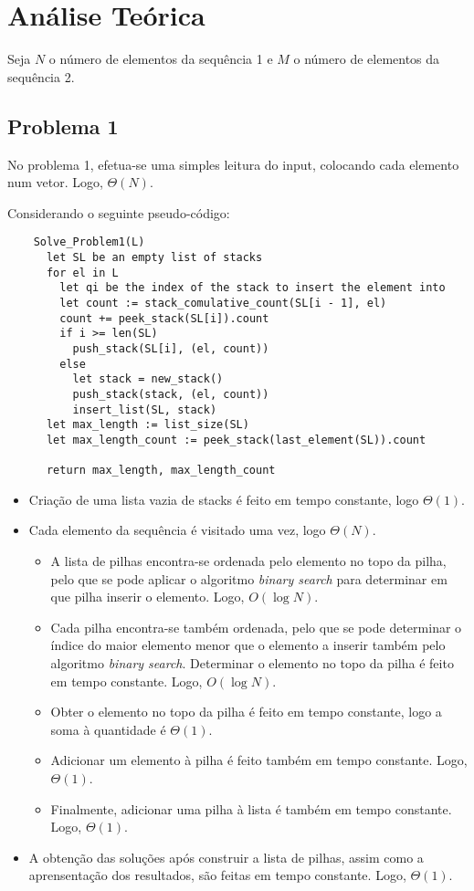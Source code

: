 \documentclass[12pt,a4paper]{article}
\begin{document}
  \section{Análise Teórica}

  Seja $N$ o número de elementos da sequência 1 e $M$ o número de elementos da sequência 2.

  \subsection{Problema 1}

  No problema 1, efetua-se uma simples leitura do input, colocando cada elemento num vetor. Logo, $\Theta(N)$.

  Considerando o seguinte pseudo-código:

  \begin{verbatim}
    Solve_Problem1(L)
      let SL be an empty list of stacks
      for el in L
        let qi be the index of the stack to insert the element into
        let count := stack_comulative_count(SL[i - 1], el)
        count += peek_stack(SL[i]).count
        if i >= len(SL)
          push_stack(SL[i], (el, count))
        else
          let stack = new_stack()
          push_stack(stack, (el, count))
          insert_list(SL, stack)
      let max_length := list_size(SL)
      let max_length_count := peek_stack(last_element(SL)).count

      return max_length, max_length_count
  \end{verbatim}

  \begin{itemize}
    \item Criação de uma lista vazia de stacks é feito em tempo constante, logo $\Theta(1)$.
    \item Cada elemento da sequência é visitado uma vez, logo $\Theta(N)$.
    \begin{itemize}
      \item A lista de pilhas encontra-se ordenada pelo elemento no topo da pilha, pelo que se pode aplicar o algoritmo \textit{binary search} para determinar em que pilha inserir o elemento. Logo, $O(\log N)$.
      \item Cada pilha encontra-se também ordenada, pelo que se pode determinar o índice do maior elemento menor que o elemento a inserir também pelo algoritmo \textit{binary search}. Determinar o elemento no topo da pilha é feito em tempo constante. Logo, $O(\log N)$.
      \item Obter o elemento no topo da pilha é feito em tempo constante, logo a soma à quantidade é $\Theta(1)$.
      \item Adicionar um elemento à pilha é feito também em tempo constante. Logo, $\Theta(1)$.
      \item Finalmente, adicionar uma pilha à lista é também em tempo constante. Logo, $\Theta(1)$.
    \end{itemize}
    \item A obtenção das soluções após construir a lista de pilhas, assim como a aprensentação dos resultados, são feitas em tempo constante. Logo, $\Theta(1)$.
  \end{itemize}
\end{document}

